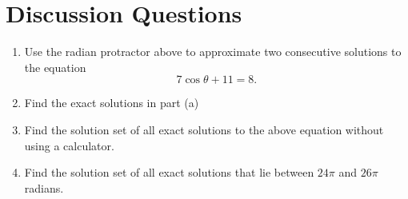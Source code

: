 \documentclass{ximera}
\begin{document}
\section{Discussion Questions}

\begin{question}  \label{Q:4dDFEFR33g3e}

 
\begin{onlineOnly}
    \begin{center}
\end{center}
\end{onlineOnly}

\begin{enumerate}
\item Use the radian protractor above to approximate two consecutive solutions to the equation
\[
   7 \cos\theta +11 =  8 .  
\]

\item Find the exact solutions in part (a)

\item Find the solution set of all exact solutions to the above equation without using a calculator.

\item Find the solution set of all exact solutions that lie between $24\pi$ and $26\pi$ radians.

\end{enumerate}
\end{question}
\end{document}
